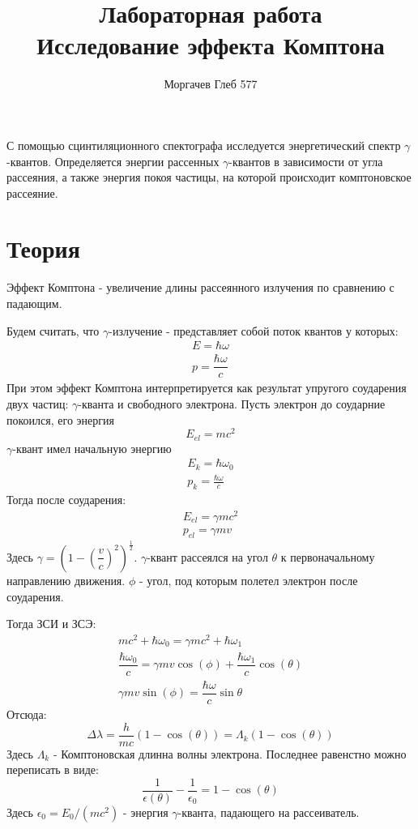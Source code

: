 \documentclass[12pt]{article}
\author{Моргачев Глеб 577}
\title{\textbf{Лабораторная работа \textnumero 1.2} \\{Исследование эффекта Комптона}}
\date{}
\begin{document}
	\maketitle

	С помощью сцинтиляционного спектографа исследуется энергетический спектр $\gamma$\--квантов.
	Определяется энергии рассенных $\gamma$\--квантов в зависимости от угла рассеяния, а также энергия покоя частицы, на которой происходит комптоновское рассеяние.
	\section*{Теория}
	
		Эффект Комптона \-- увеличение длины рассеянного излучения по сравнению с падающим.
		
		Будем считать, что $\gamma$\--излучение \-- представляет собой поток квантов у которых:
		\begin{eqnarray}
		    E = \hbar\omega \\
			p = \dfrac{\hbar\omega}{c}
		\end{eqnarray}
        При этом эффект Комптона интерпретируется как результат упругого соударения двух частиц: $\gamma$\--кванта и свободного электрона. 
		Пусть электрон до соударние покоился, его энергия 
		\begin{equation}
			E_{el} = mc^2
		\end{equation}
		$\gamma$\--квант имел начальную энергию 
		\begin{eqnarray}
		    E_k = \hbar\omega_0 \\
			p_k = \frac{\hbar\omega}{c}
		\end{eqnarray}
		Тогда после соударения:
		\begin{eqnarray}
			E_{el} = \gamma mc^2 \\
			p_{el} = \gamma mv
		\end{eqnarray}
		Здесь $\gamma = \left(1 - \left(\dfrac{v}{c}\right)^2\right)^\frac{1}{2}$.
		$\gamma$\--квант рассеялся на угол $\theta$ к первоначальному направлению движения.
		$\phi$ \-- угол, под которым полетел электрон после соударения.
		
		Тогда ЗСИ и ЗСЭ:
		\begin{eqnarray}
			mc^2 + \hbar\omega_0 = \gamma mc^2 + \hbar\omega_1 \\
			\dfrac{\hbar\omega_0}{c} = \gamma mv\cos(\phi) + \dfrac{\hbar\omega_1}{c}\cos(\theta) \\
			\gamma mv \sin(\phi) = \dfrac{\hbar\omega}{c}\sin{\theta}
		\end{eqnarray}
		Отсюда:
		\begin{equation}
			\Delta\lambda = \dfrac{h}{mc}(1 - \cos(\theta)) = \Lambda_k(1 - \cos(\theta))
		\end{equation}
		Здесь $\Lambda_k$ \-- Комптоновская длинна волны электрона.
		Последнее равенстно можно переписать в виде:
		\begin{equation}
			\dfrac{1}{\epsilon(\theta)} - \dfrac{1}{\epsilon_0} = 1 - \cos(\theta)
		\end{equation}
		Здесь $\epsilon_0 = E_0/(mc^2)$ \-- энергия $\gamma$\--кванта, падающего на рассеиватель.
		
\end{document}

